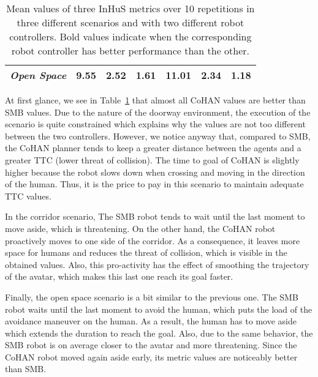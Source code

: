 \begin{table}[]
\begin{tabular}{c|ccc|ccc|}
    \multicolumn{1}{|c|}{\textit{Open Space}} & \multicolumn{1}{c|}{\textbf{9.55}}                                              & \multicolumn{1}{c|}{\textbf{2.52}}                                                    & \textbf{1.61}                                                  & \multicolumn{1}{c|}{11.01}                                                      & \multicolumn{1}{c|}{2.34}                                                             & 1.18                                                           \\ \hline
    \end{tabular}
    \caption{Mean values of three InHuS metrics over 10 repetitions in three different scenarios and with two different robot controllers. Bold values indicate when the corresponding robot controller has better performance than the other.}
    \label{tab:compare_robots}
\end{table}

At first glance, we see in Table~\ref{tab:compare_robots} that almost all CoHAN values are better than SMB values. Due to the nature of the doorway environment, the execution of the scenario is quite constrained which explains why the values are not too different between the two controllers. However, we notice anyway that, compared to SMB, the CoHAN planner tends to keep a greater distance between the agents and a greater TTC (lower threat of collision). The time to goal of CoHAN is slightly higher because the robot slows down when crossing and moving in the direction of the human. Thus, it is the price to pay in this scenario to maintain adequate TTC values.

In the corridor scenario, The SMB robot tends to wait until the last moment to move aside, which is threatening. On the other hand, the CoHAN robot proactively moves to one side of the corridor. As a consequence, it leaves more space for humans and reduces the threat of collision, which is visible in the obtained values. Also, this pro-activity has the effect of smoothing the trajectory of the avatar, which makes this last one reach its goal faster.

Finally, the open space scenario is a bit similar to the previous one. The SMB robot waits until the last moment to avoid the human, which puts the load of the avoidance maneuver on the human. As a result, 
the human has to move aside which extends the duration to reach the goal. Also, due to the same behavior, the SMB robot is on average closer to the avatar and more threatening. Since the CoHAN robot moved again aside early, its metric values are noticeably better than SMB.

